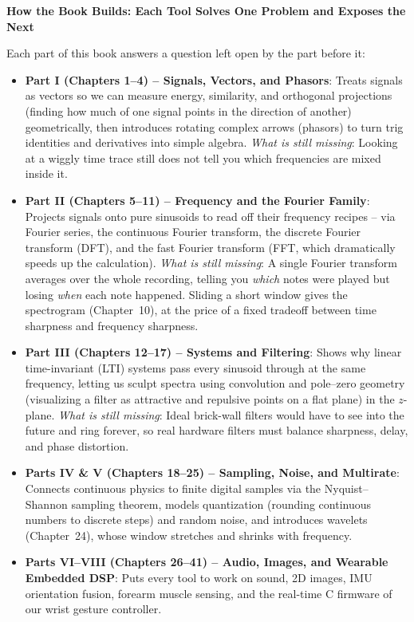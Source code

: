 \begin{connectionbox}
\textbf{How the Book Builds: Each Tool Solves One Problem and Exposes the Next}

Each part of this book answers a question left open by the part before it:
\begin{itemize}
  \item \textbf{Part I (Chapters 1--4) -- Signals, Vectors, and Phasors}: Treats signals as vectors
  so we can measure energy, similarity, and orthogonal projections (finding how much of one signal points in the direction of another) geometrically, then introduces
  rotating complex arrows (phasors) to turn trig identities and derivatives into simple algebra.
  \emph{What is still missing}: Looking at a wiggly time trace still does not tell you which
  frequencies are mixed inside it.
  \item \textbf{Part II (Chapters 5--11) -- Frequency and the Fourier Family}: Projects signals onto
  pure sinusoids to read off their frequency recipes -- via Fourier series, the continuous Fourier
  transform, the discrete Fourier transform (DFT), and the fast Fourier transform (FFT, which dramatically speeds up the calculation).
  \emph{What is still missing}: A single Fourier transform averages over the whole recording, telling
  you \emph{which} notes were played but losing \emph{when} each note happened. Sliding a short window
  gives the spectrogram (Chapter~10), at the price of a fixed tradeoff between time sharpness and
  frequency sharpness.
  \item \textbf{Part III (Chapters 12--17) -- Systems and Filtering}: Shows why linear time-invariant
  (LTI) systems pass every sinusoid through at the same frequency, letting us sculpt spectra using
  convolution and pole--zero geometry (visualizing a filter as attractive and repulsive points on a flat plane) in the $z$-plane. \emph{What is still missing}: Ideal brick-wall
  filters would have to see into the future and ring forever, so real hardware filters must balance
  sharpness, delay, and phase distortion.
  \item \textbf{Parts IV \& V (Chapters 18--25) -- Sampling, Noise, and Multirate}: Connects continuous
  physics to finite digital samples via the Nyquist--Shannon sampling theorem, models quantization (rounding continuous numbers to discrete steps) and
  random noise, and introduces wavelets (Chapter~24), whose window stretches and shrinks with frequency.
  \item \textbf{Parts VI--VIII (Chapters 26--41) -- Audio, Images, and Wearable Embedded DSP}: Puts
  every tool to work on sound, 2D images, IMU orientation fusion, forearm muscle sensing, and the
  real-time C firmware of our wrist gesture controller.
\end{itemize}
\end{connectionbox}

